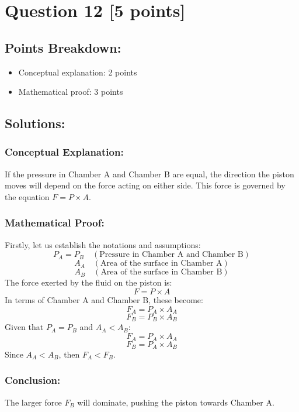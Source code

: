 \documentclass[12pt]{article}
\begin{document}
\newpage
\section*{Question 12 [5 points]}
\subsection*{Points Breakdown:}
\begin{itemize}
    \item Conceptual explanation: 2 points
    \item Mathematical proof: 3 points
\end{itemize}

\subsection*{Solutions:}
\subsubsection*{Conceptual Explanation:}
If the pressure in Chamber A and Chamber B are equal, the direction the piston moves will depend on the force acting on either side. This force is governed by the equation \( F = P \times A \).
\subsubsection*{Mathematical Proof:}
Firstly, let us establish the notations and assumptions:
\[
P_A = P_B \quad (\text{Pressure in Chamber A and Chamber B})
\]
\[
A_A \quad (\text{Area of the surface in Chamber A})
\]
\[
A_B \quad (\text{Area of the surface in Chamber B})
\]
The force exerted by the fluid on the piston is:
\[
F = P \times A
\]
In terms of Chamber A and Chamber B, these become:
\[
F_A = P_A \times A_A
\]
\[
F_B = P_B \times A_B
\]
Given that \( P_A = P_B \) and \( A_A < A_B \):
\[
F_A = P_A \times A_A
\]
\[
F_B = P_A \times A_B
\]
Since \( A_A < A_B \), then \( F_A < F_B \).
\subsubsection*{Conclusion:}
The larger force \( F_B \) will dominate, pushing the piston towards Chamber A.
\end{document}
